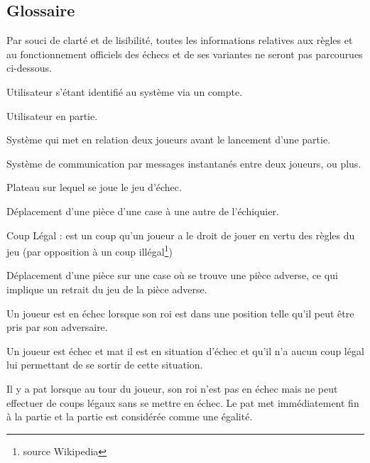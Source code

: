 \documentclass[10pt, a4paper]{article}
\begin{document}
		\subsection{Glossaire} Par souci de clarté et de lisibilité, toutes les informations relatives aux règles et au fonctionnement officiels des échecs et de ses variantes ne seront pas parcourues ci-dessous.
		\begin{description}
		\item[Un utilisateur :] Utilisateur s'étant identifié au système via un compte.
		\item[Joueur :] Utilisateur en partie.
		\item[Matchmaking :] Système qui met en relation deux joueurs avant le lancement d'une partie.
		\item[Chat :] Système de communication par messages instantanés entre deux joueurs, ou plus.
		\item[Echiquier (Board) :] Plateau sur lequel se joue le jeu d'échec.
		\item[Coup/Mouvement :] Déplacement d'une pièce d'une case à une autre de l'échiquier.
		\item{Coup Légal :} est un coup qu'un joueur a le droit de jouer en vertu des règles du jeu (par opposition à un coup illégal\footnote{source Wikipedia})
		\item[Prise :] Déplacement d'une pièce sur une case où se trouve une pièce adverse, ce qui implique un retrait du jeu de la pièce adverse.
		\item[Echec :] Un joueur est en échec lorsque son roi est dans une position telle qu'il peut être pris par son adversaire.
		\item[Echec et mat :] Un joueur est échec et mat il est en situation d'échec et qu'il n'a aucun coup légal lui permettant de se sortir de cette situation.
		\item[Pat :] Il y a pat lorsque au tour du joueur, son roi n'est pas en échec mais ne peut effectuer de coups légaux sans se mettre en échec. Le pat met immédiatement fin à la partie et la partie est considérée comme une égalité.

\end{description}
\end{document}
